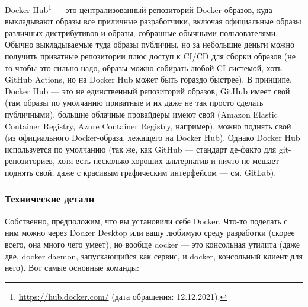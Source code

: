 \documentclass{../text-style}
\begin{document}
Docker Hub\footnote{\url{https://hub.docker.com/} (дата обращения: 12.12.2021).} --- это централизованный репозиторий Docker-образов, куда выкладывают образы все приличные разработчики, включая официальные образы различных дистрибутивов и образы, собранные обычными пользователями. Обычно выкладываемые туда образы публичны, но за небольшие деньги можно получить приватные репозитории плюс доступ к CI/CD для сборки образов (не то чтобы это сильно надо, образы можно собирать любой CI-системой, хоть GitHub Actions, но на Docker Hub может быть гораздо быстрее). В принципе, Docker Hub --- это не единственный репозиторий образов, GitHub имеет свой (там образы по умолчанию приватные и их даже не так просто сделать публичными), большие облачные провайдеры имеют свой (Amazon Elastic Container Registry, Azure Container Registry, например), можно поднять свой (из официального Docker-образа, лежащего на Docker Hub). Однако Docker Hub используется по умолчанию (так же, как GitHub --- стандарт де-факто для git-репозиториев, хотя есть несколько хороших альтернатив и ничто не мешает поднять свой, даже с красивым графическим интерфейсом --- см. GitLab).

\subsubsection{Технические детали}

Собственно, предположим, что вы установили себе Docker. Что-то поделать с ним можно через Docker Desktop или вашу любимую среду разработки (скорее всего, она много чего умеет), но вообще docker --- это консольная утилита (даже две, docker daemon, запускающийся как сервис, и docker, консольный клиент для него). Вот самые основные команды:
\end{document}
